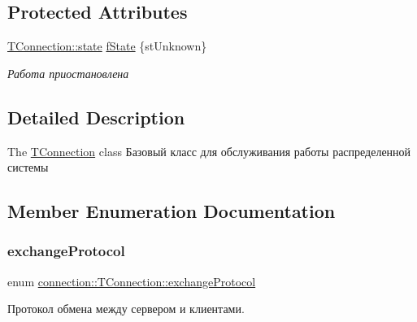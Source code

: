 \subsection*{Protected Attributes}
\begin{DoxyCompactItemize}
\item 
\mbox{\label{classconnection_1_1_t_connection_a4bc0e17704fa1b8afea4bfdcea876798}} 
\hyperlink{classconnection_1_1_t_connection_aee7dfb7510592bd2697ab6f906b9612c}{T\+Connection\+::state} \hyperlink{classconnection_1_1_t_connection_a4bc0e17704fa1b8afea4bfdcea876798}{f\+State} \{st\+Unknown\}
\begin{DoxyCompactList}\small\item\em Работа приостановлена \end{DoxyCompactList}\end{DoxyCompactItemize}


\subsection{Detailed Description}
The \hyperlink{classconnection_1_1_t_connection}{T\+Connection} class Базовый класс для обслуживания работы распределенной системы 

\subsection{Member Enumeration Documentation}
\mbox{\label{classconnection_1_1_t_connection_a3550181cb2fa72eccfa55d23f45cea34}} 
\subsubsection{\texorpdfstring{exchange\+Protocol}{exchangeProtocol}}
{\footnotesize\ttfamily enum \hyperlink{classconnection_1_1_t_connection_a3550181cb2fa72eccfa55d23f45cea34}{connection\+::\+T\+Connection\+::exchange\+Protocol}}



Протокол обмена между сервером и клиентами. 

